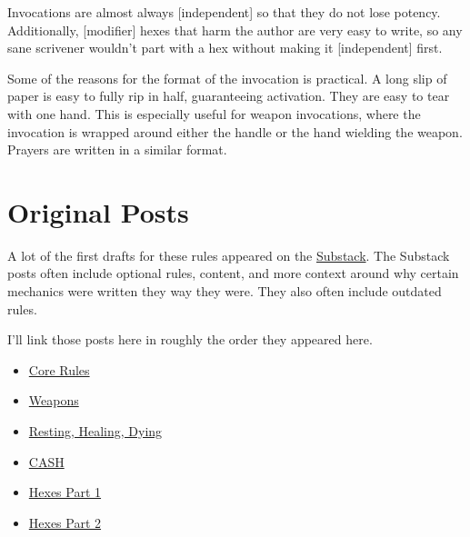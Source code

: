 \documentclass[
  letterpaper,
  DIV=11,
  numbers=noendperiod]{scrartcl}
\providecommand{\tightlist}{%
  \setlength{\itemsep}{0pt}\setlength{\parskip}{0pt}}\usepackage{longtable,booktabs,array}
\begin{document}
Invocations are almost always {[}independent{]} so that they do not lose
potency. Additionally, {[}modifier{]} hexes that harm the author are
very easy to write, so any sane scrivener wouldn't part with a hex
without making it {[}independent{]} first.

Some of the reasons for the format of the invocation is practical. A
long slip of paper is easy to fully rip in half, guaranteeing
activation. They are easy to tear with one hand. This is especially
useful for weapon invocations, where the invocation is wrapped around
either the handle or the hand wielding the weapon. Prayers are written
in a similar format.

\section{Original Posts}\label{original-posts}

A lot of the first drafts for these rules appeared on the
\href{https://actlite.substack.com/}{Substack}. The Substack posts often
include optional rules, content, and more context around why certain
mechanics were written they way they were. They also often include
outdated rules.

I'll link those posts here in roughly the order they appeared here.

\begin{itemize}
\tightlist
\item
  \href{https://actlite.substack.com/p/core-rules}{Core Rules}
\item
  \href{https://actlite.substack.com/p/weapons}{Weapons}
\item
  \href{https://actlite.substack.com/p/resting-healing-dying}{Resting,
  Healing, Dying}
\item
  \href{https://actlite.substack.com/p/the-essential-johnny-cash}{CASH}
\item
  \href{https://actlite.substack.com/p/hexes-part-1-the-rules}{Hexes
  Part 1}
\item
  \href{https://actlite.substack.com/publish/posts/detail/142442758?referrer=\%2Fpublish\%2Fposts}{Hexes
  Part 2}
\end{itemize}
\end{document}
